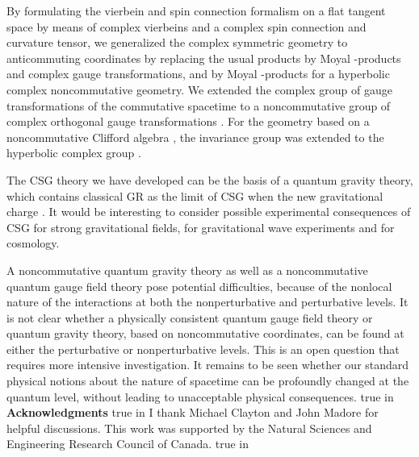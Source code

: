 \documentclass[a4paper,10pt]{article}
\begin{document}
By formulating the vierbein and spin connection
formalism on a flat tangent space by means of complex vierbeins and a
complex spin connection and curvature tensor, we generalized the complex
symmetric geometry to anticommuting coordinates by replacing the usual
products by Moyal \myHighlight{$\diamond$}\coordHE{}-products and complex gauge transformations, and
by Moyal \myHighlight{$\diamond$}\coordHE{}-products for a hyperbolic complex noncommutative
geometry. We extended the complex group of gauge transformations \coordHE{}
of the commutative spacetime to a noncommutative group of complex
orthogonal gauge transformations \coordHE{}. For the
geometry based on a noncommutative Clifford algebra \myHighlight{$\Omega$}\coordHE{}, the
invariance group was extended to the hyperbolic complex group
\coordHE{}.

The CSG theory we have developed can be the basis of a quantum
gravity theory, which contains classical GR as the limit of CSG when the
new gravitational charge \coordHE{}. It would be interesting
to consider possible experimental consequences of CSG for strong
gravitational fields, for gravitational wave experiments and for
cosmology.

A noncommutative quantum gravity theory as well as a
noncommutative quantum gauge field theory pose potential
difficulties, because of the nonlocal nature of the interactions
at both the nonperturbative and perturbative levels. It is not clear whether 
a physically consistent quantum gauge field theory or quantum
gravity theory, based on noncommutative coordinates, can be found
at either the perturbative or nonperturbative levels. This is an
open question that requires more intensive investigation. It
remains to be seen whether our standard physical notions about
the nature of spacetime can be profoundly changed at the quantum
level, without leading to unacceptable physical consequences.
 true in {\bf Acknowledgments}
 true in
I thank Michael Clayton and John Madore for helpful discussions. This
work was supported by the Natural Sciences and Engineering Research Council
of Canada.
 true in
\end{document}
